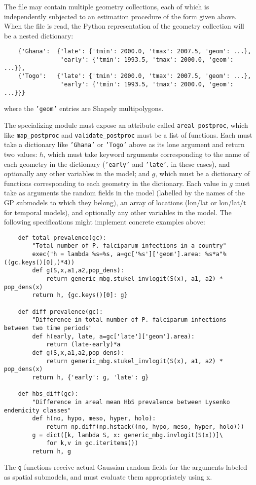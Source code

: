 The file may contain multiple geometry collections, each of which is independently subjected to an estimation procedure of the form given above. When the file is read, the Python representation of the geometry collection will be a nested dictionary:
\begin{verbatim}
    {'Ghana':  {'late': {'tmin': 2000.0, 'tmax': 2007.5, 'geom': ...}, 
                'early': {'tmin': 1993.5, 'tmax': 2000.0, 'geom': ...}},
    {'Togo':   {'late': {'tmin': 2000.0, 'tmax': 2007.5, 'geom': ...}, 
                'early': {'tmin': 1993.5, 'tmax': 2000.0, 'geom': ...}}}
\end{verbatim}
where the \texttt{'geom'} entries are Shapely multipolygons.

The specializing module must expose an attribute called \texttt{areal\_postproc}, which like \texttt{map\_postproc} and \texttt{validate\_postproc} must be a list of functions. Each must take a dictionary like \texttt{'Ghana'} or \texttt{'Togo'} above as its lone argument and return two values: $h$, which must take keyword arguments corresponding to the name of each geometry in the dictionary (\texttt{'early'} and \texttt{'late'}, in these cases), and optionally any other variables in the model; and $g$, which must be a dictionary of functions corresponding to each geometry in the dictionary. Each value in $g$ must take as arguments the random fields in the model (labelled by the names of the GP submodels to which they belong), an array of locations (lon/lat or lon/lat/t for temporal models), and optionally any other variables in the model. The following specifications might implement concrete examples above:
\begin{verbatim}
    def total_prevalence(gc):
        "Total number of P. falciparum infections in a country"
        exec("h = lambda %s=%s, a=gc['%s']['geom'].area: %s*a"%((gc.keys()[0],)*4))
        def g(S,x,a1,a2,pop_dens):
            return generic_mbg.stukel_invlogit(S(x), a1, a2) * pop_dens(x)
        return h, {gc.keys()[0]: g}
    
    def diff_prevalence(gc):
        "Difference in total number of P. falciparum infections between two time periods"
        def h(early, late, a=gc['late']['geom'].area):
            return (late-early)*a
        def g(S,x,a1,a2,pop_dens):
            return generic_mbg.stukel_invlogit(S(x), a1, a2) * pop_dens(x)
        return h, {'early': g, 'late': g}
    
    def hbs_diff(gc):
        "Difference in areal mean HbS prevalence between Lysenko endemicity classes"
        def h(no, hypo, meso, hyper, holo):
            return np.diff(np.hstack((no, hypo, meso, hyper, holo)))
        g = dict([k, lambda S, x: generic_mbg.invlogit(S(x))]\
            for k,v in gc.iteritems())
        return h, g
\end{verbatim}
The \texttt{g} functions receive actual Gaussian random fields for the arguments labeled as spatial submodels, and must evaluate them appropriately using x.

